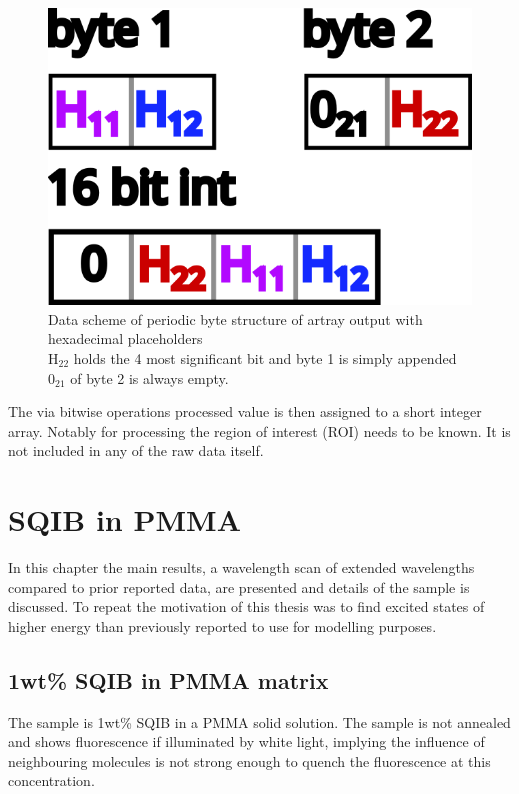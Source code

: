 \documentclass[twoside,openright]{scrreprt}
\begin{document}
\begin{figure}[hbtp]
\centering
\includegraphics[scale=1]{images/ArtrayByteImage.png}
\caption{Data scheme of periodic byte structure of artray output with hexadecimal placeholders\\
$\mathrm{H_{22}}$ holds the 4 most significant bit and byte 1 is simply appended\\
$\mathrm{0_{21}}$ of byte 2 is always empty.\label{fig:ByteArtrayOut}}
\end{figure}

The via bitwise operations processed value is then assigned to a short integer array. Notably for processing the region of interest (ROI) needs to be known. It is not included in any of the raw data itself.

\chapter{SQIB in PMMA}
In this chapter the main results, a wavelength scan of extended wavelengths compared to prior reported data, are presented and details of the sample is discussed. To repeat the motivation of this thesis was to find excited states of higher energy than previously reported to use for modelling purposes.

\section{1wt\% SQIB in PMMA matrix}
The sample is 1wt\% SQIB in a PMMA solid solution. The sample is not annealed and shows fluorescence if illuminated by white light, implying the influence of neighbouring molecules is not strong enough to quench the fluorescence at this concentration. \\
\end{document}
